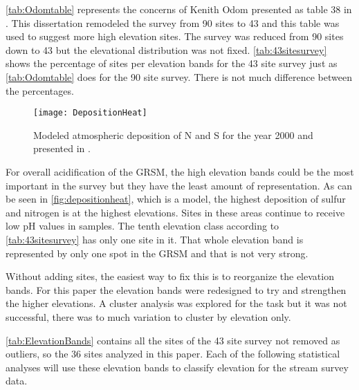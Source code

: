 



\autoref{tab:Odomtable} represents the concerns of Kenith Odom presented as table 38 in \citet{odom2003}.
This dissertation remodeled the survey from 90 sites to 43 and this table was used to suggest more high elevation sites.
The survey was reduced from 90 sites down to 43 but the elevational distribution was not fixed.
\autoref{tab:43sitesurvey} shows the percentage of sites per elevation bands for the 43 site survey just as \autoref{tab:Odomtable} does for the 90 site survey.
There is not much difference between the percentages.

\begin{figure}[h!]
  \centering
  \texttt{[image: DepositionHeat]}\\
  \caption{ Modeled atmospheric deposition of N and S for the year 2000 and presented in \citet{weathers2006}.}\label{fig:depositionheat}
\end{figure}

For overall acidification of the GRSM, the high elevation bands could be the most important in the survey but they have the least amount of representation.
As can be seen in \autoref{fig:depositionheat}, which is a model, the highest deposition of sulfur and nitrogen is at the highest elevations.
Sites in these areas continue to receive low pH values in samples.
The tenth elevation class according to \autoref{tab:43sitesurvey} has only one site in it.
That whole elevation band is represented by only one spot in the GRSM and that is not very strong.

Without adding sites, the easiest way to fix this is to reorganize the elevation bands. 
For this paper the elevation bands were redesigned to try and strengthen the higher elevations.
A cluster analysis was explored for the task but it was not successful, there was to much variation to cluster by elevation only.



\autoref{tab:ElevationBands} contains all the sites of the 43 site survey not removed as outliers, so the 36 sites analyzed in this paper.
Each of the following statistical analyses will use these elevation bands to classify elevation for the stream survey data.

